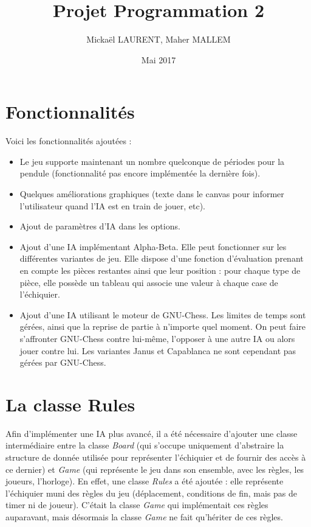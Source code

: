 \documentclass[11pt]{article}
\title{Projet Programmation 2}
\author{Mickaël LAURENT, Maher MALLEM}
\date{Mai 2017}
\begin{document}
\renewcommand{\labelitemi}{-}
\maketitle

\-

\section{Fonctionnalités}

Voici les fonctionnalités ajoutées :\newline
\begin{itemize}
\item Le jeu supporte maintenant un nombre quelconque de périodes pour la pendule (fonctionnalité pas encore implémentée la dernière fois).
\item Quelques améliorations graphiques (texte dans le canvas pour informer l'utilisateur quand l'IA est en train de jouer, etc).
\item Ajout de paramètres d'IA dans les options.
\item Ajout d'une IA implémentant Alpha-Beta. Elle peut fonctionner sur les différentes variantes de jeu. Elle dispose d'une fonction d'évaluation prenant en compte les pièces restantes ainsi que leur position : pour chaque type de pièce, elle possède un tableau qui associe une valeur à chaque case de l'échiquier.
\item Ajout d'une IA utilisant le moteur de GNU-Chess. Les limites de temps sont gérées, ainsi que la reprise de partie à n'importe quel moment. On peut faire s'affronter GNU-Chess contre lui-même, l'opposer à une autre IA ou alors jouer contre lui. Les variantes Janus et Capablanca ne sont cependant pas gérées par GNU-Chess.
\end{itemize}

\section{La classe Rules}
Afin d'implémenter une IA plus avancé, il a été nécessaire d'ajouter une classe intermédiaire entre la classe \textit{Board} (qui s'occupe uniquement d'abstraire la structure de donnée utilisée pour représenter l'échiquier et de fournir des accès à ce dernier) et \textit{Game} (qui représente le jeu dans son ensemble, avec les règles, les joueurs, l'horloge). En effet, une classe \textit{Rules} a été ajoutée : elle représente l'échiquier muni des règles du jeu (déplacement, conditions de fin, mais pas de timer ni de joueur). C'était la classe \textit{Game} qui implémentait ces règles auparavant, mais désormais la classe \textit{Game} ne fait qu'hériter de ces règles. 
\end{document}
